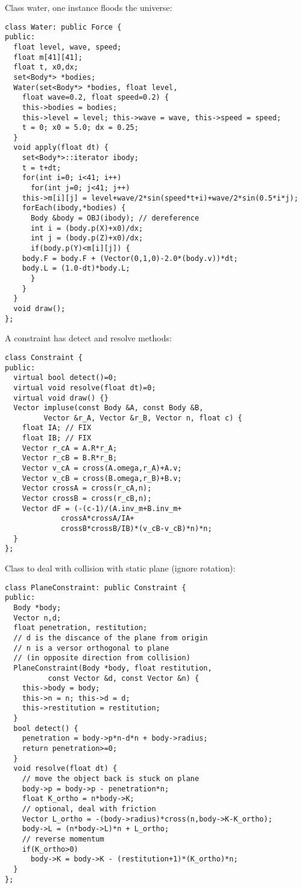\noindent
Class water, one instance floods the universe: \begin{lstlisting}
class Water: public Force {
public:
  float level, wave, speed;
  float m[41][41];  
  float t, x0,dx;
  set<Body*> *bodies;
  Water(set<Body*> *bodies, float level, 
	float wave=0.2, float speed=0.2) {
    this->bodies = bodies;
    this->level = level; this->wave = wave, this->speed = speed;
    t = 0; x0 = 5.0; dx = 0.25;
  }
  void apply(float dt) {
    set<Body*>::iterator ibody;
    t = t+dt;
    for(int i=0; i<41; i++)
      for(int j=0; j<41; j++)
	this->m[i][j] = level+wave/2*sin(speed*t+i)+wave/2*sin(0.5*i*j);
    forEach(ibody,*bodies) {
      Body &body = OBJ(ibody); // dereference
      int i = (body.p(X)+x0)/dx;
      int j = (body.p(Z)+x0)/dx;
      if(body.p(Y)<m[i][j]) {
	body.F = body.F + (Vector(0,1,0)-2.0*(body.v))*dt;    
	body.L = (1.0-dt)*body.L;
      }
    }
  }
  void draw();
};
\end{lstlisting}
\noindent
A constraint has detect and resolve methods: \begin{lstlisting}
class Constraint {
public:  
  virtual bool detect()=0;
  virtual void resolve(float dt)=0;
  virtual void draw() {}
  Vector impluse(const Body &A, const Body &B, 
		 Vector &r_A, Vector &r_B, Vector n, float c) {
    float IA; // FIX
    float IB; // FIX
    Vector r_cA = A.R*r_A;
    Vector r_cB = B.R*r_B;
    Vector v_cA = cross(A.omega,r_A)+A.v;
    Vector v_cB = cross(B.omega,r_B)+B.v;
    Vector crossA = cross(r_cA,n);
    Vector crossB = cross(r_cB,n);
    Vector dF = (-(c-1)/(A.inv_m+B.inv_m+
			 crossA*crossA/IA+
			 crossB*crossB/IB)*(v_cB-v_cB)*n)*n;
  }
};
\end{lstlisting}
\noindent
Class to deal with collision with static plane
(ignore rotation): \begin{lstlisting}
class PlaneConstraint: public Constraint {
public:
  Body *body;
  Vector n,d;
  float penetration, restitution;
  // d is the discance of the plane from origin
  // n is a versor orthogonal to plane 
  // (in opposite direction from collision)
  PlaneConstraint(Body *body, float restitution,
		  const Vector &d, const Vector &n) {
    this->body = body;
    this->n = n; this->d = d;
    this->restitution = restitution;
  }
  bool detect() {
    penetration = body->p*n-d*n + body->radius;
    return penetration>=0;
  }
  void resolve(float dt) {
    // move the object back is stuck on plane 
    body->p = body->p - penetration*n;
    float K_ortho = n*body->K;
    // optional, deal with friction 
    Vector L_ortho = -(body->radius)*cross(n,body->K-K_ortho);
    body->L = (n*body->L)*n + L_ortho;
    // reverse momentum
    if(K_ortho>0)
      body->K = body->K - (restitution+1)*(K_ortho)*n;
  }
};
\end{lstlisting}
